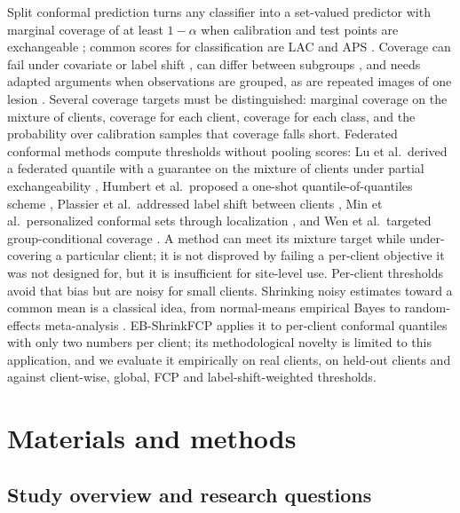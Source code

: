 \documentclass[VANCOUVER,Times1COL]{WileyNJDv5}
\begin{document}
Split conformal prediction turns any classifier into a set-valued predictor with marginal coverage of at
least $1-\alpha$ when calibration and test points are exchangeable
\cite{vovk2005algorithmic,angelopoulos2023gentle}; common scores for classification
are LAC \cite{sadinle2019lac} and APS \cite{romano2020aps}. Coverage can fail under
covariate or label shift \cite{tibshirani2019covariate,podkopaev2021labelshift,barber2023beyond}, can
differ between subgroups \cite{lu2022fair}, and needs adapted arguments when observations are grouped,
as are repeated images of one lesion \cite{dunn2022hierarchical,lee2023hierarchical}. Several coverage
targets must be distinguished: marginal coverage on the mixture of clients, coverage for each client,
coverage for each class, and the probability over calibration samples that coverage falls short.
Federated conformal methods compute thresholds without pooling scores: Lu et al.\ derived a federated
quantile with a guarantee on the mixture of clients under partial exchangeability
\cite{lu2023fcp}, Humbert et al.\ proposed a one-shot quantile-of-quantiles scheme
\cite{humbert2023oneshot}, Plassier et al.\ addressed label shift between clients
\cite{plassier2023labelshift}, Min et al.\ personalized conformal sets through localization
\cite{min2025pfcp}, and Wen et al.\ targeted group-conditional coverage \cite{wen2026gcfcp}. A method can
meet its mixture target while under-covering a particular client; it is not disproved by failing a per-client objective it was not designed for, but it is insufficient for site-level use. Per-client thresholds avoid that bias
but are noisy for small clients. Shrinking noisy estimates toward a common mean is a classical idea,
from normal-means empirical Bayes \cite{efron1975stein} to random-effects meta-analysis
\cite{dersimonian1986meta}. EB-ShrinkFCP applies it to per-client conformal quantiles with only two
numbers per client; its methodological novelty is limited to this application, and we evaluate it
empirically on real clients, on held-out clients and against client-wise, global, FCP and
label-shift-weighted thresholds.

\section{Materials and methods}
\label{sec:methods}

\subsection{Study overview and research questions}
\label{sec:overview}
\end{document}
